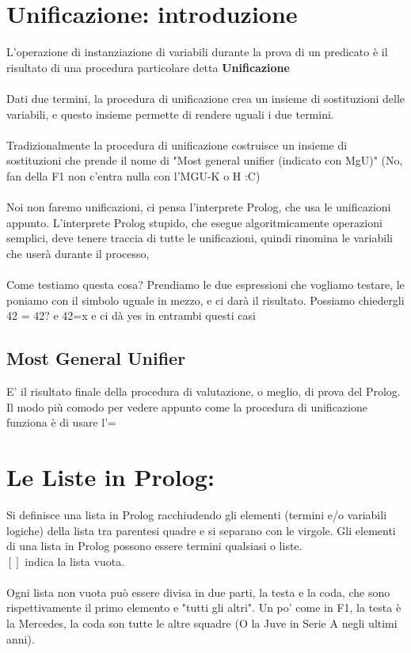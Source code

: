 \documentclass[12pt, a4paper, openany, oneside]{book}
\begin{document}
{\section{Unificazione: introduzione}
L'operazione di instanziazione di variabili durante la prova di un predicato è il 
risultato di una procedura particolare detta \textbf{Unificazione} \\ \\
Dati due termini, la procedura di unificazione crea un insieme di sostituzioni 
delle variabili, e questo insieme permette di rendere uguali i due termini. \\
\\ 
Tradizionalmente la procedura di unificazione costruisce un insieme di sostituzioni
che prende il nome di "Most general unifier (indicato con MgU)" (No, fan della F1
non c'entra nulla con l'MGU-K o H :C)
\\ \\ 
Noi non faremo unificazioni, ci pensa l'interprete Prolog, che usa le 
unificazioni appunto. L'interprete Prolog stupido, che esegue algoritmicamente
operazioni semplici, deve tenere traccia di tutte le unificazioni, quindi rinomina
le variabili che userà durante il processo,
\\ \\
Come testiamo questa cosa? Prendiamo le due espressioni che vogliamo testare, le
poniamo con il simbolo uguale in mezzo, e ci darà il risultato. Possiamo chiedergli
42 = 42? e 42=x e ci dà yes in entrambi questi casi
\subsection{Most General Unifier} 
E' il risultato finale della procedura di valutazione, o meglio, di prova del 
Prolog. \\
Il modo più comodo per vedere appunto come la procedura di unificazione funziona 
è di usare l'=
\section{Le Liste in Prolog: }
Si definisce una lista in Prolog racchiudendo gli elementi (termini e/o variabili
logiche) della lista tra parentesi quadre e si separano con le virgole.
Gli elementi di una lista in Prolog possono essere termini qualsiasi o liste. \\
$[]$ indica la lista vuota.
\\ \\
Ogni lista non vuota può essere divisa in due parti, la testa e la coda, che sono
rispettivamente il primo elemento e "tutti gli altri". Un po' come in F1, la 
testa è la Mercedes, la coda son tutte le altre squadre (O la Juve in Serie A
negli ultimi anni).
}
\end{document}
